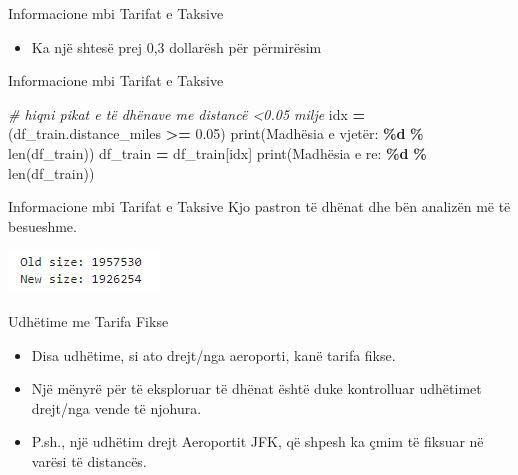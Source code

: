 \documentclass[
  ignorenonframetext,
]{beamer}
\newenvironment{Shaded}{\begin{snugshade}}{\end{snugshade}}
\newcommand{\BuiltInTok}[1]{#1}
\newcommand{\CommentTok}[1]{\textcolor[rgb]{0.56,0.35,0.01}{\textit{#1}}}
\newcommand{\FloatTok}[1]{\textcolor[rgb]{0.00,0.00,0.81}{#1}}
\newcommand{\NormalTok}[1]{#1}
\newcommand{\OperatorTok}[1]{\textcolor[rgb]{0.81,0.36,0.00}{\textbf{#1}}}
\newcommand{\SpecialCharTok}[1]{\textcolor[rgb]{0.81,0.36,0.00}{\textbf{#1}}}
\newcommand{\StringTok}[1]{\textcolor[rgb]{0.31,0.60,0.02}{#1}}
\providecommand{\tightlist}{%
  \setlength{\itemsep}{0pt}\setlength{\parskip}{0pt}}
\begin{document}
\begin{frame}{Informacione mbi Tarifat e Taksive}
\protect\hypertarget{informacione-mbi-tarifat-e-taksive-3}{}
\begin{itemize}
\tightlist
\item
  Ka një shtesë prej 0,3 dollarësh për përmirësim
\end{itemize}
\end{frame}

\begin{frame}[fragile]{Informacione mbi Tarifat e Taksive}
\protect\hypertarget{informacione-mbi-tarifat-e-taksive-4}{}

\begin{Shaded}
\begin{Highlighting}[]
\CommentTok{\# hiqni pikat e të dhënave me distancë \textless{}0.05 milje}
\NormalTok{idx }\OperatorTok{=}\NormalTok{ (df\_train.distance\_miles }\OperatorTok{\textgreater{}=} \FloatTok{0.05}\NormalTok{)}
\BuiltInTok{print}\NormalTok{(}\StringTok{\textquotesingle{}Madhësia e vjetër: }\SpecialCharTok{\%d}\StringTok{\textquotesingle{}} \OperatorTok{\%} \BuiltInTok{len}\NormalTok{(df\_train))}
\NormalTok{df\_train }\OperatorTok{=}\NormalTok{ df\_train[idx]}
\BuiltInTok{print}\NormalTok{(}\StringTok{\textquotesingle{}Madhësia e re: }\SpecialCharTok{\%d}\StringTok{\textquotesingle{}} \OperatorTok{\%} \BuiltInTok{len}\NormalTok{(df\_train))}
\end{Highlighting}
\end{Shaded}
\end{frame}

\begin{frame}{Informacione mbi Tarifat e Taksive}
\protect\hypertarget{informacione-mbi-tarifat-e-taksive-5}{}
Kjo pastron të dhënat dhe bën analizën më të besueshme.

\includegraphics{./Figs/train25.png}
\end{frame}

\begin{frame}{Udhëtime me Tarifa Fikse}
\protect\hypertarget{udhuxebtime-me-tarifa-fikse}{}
\begin{itemize}
\item
  Disa udhëtime, si ato drejt/nga aeroporti, kanë tarifa fikse.
\item
  Një mënyrë për të eksploruar të dhënat është duke kontrolluar
  udhëtimet drejt/nga vende të njohura.
\item
  P.sh., një udhëtim drejt Aeroportit JFK, që shpesh ka çmim të fiksuar
  në varësi të distancës.
\end{itemize}
\end{frame}
\end{document}
